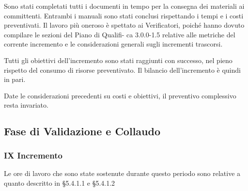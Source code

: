 Sono stati completati tutti i documenti in tempo per la consegna dei materiali ai committenti. Entrambi i manuali sono stati conclusi rispettando i tempi e i costi preventivati. Il lavoro più oneroso è spettato ai Verificatori, poiché hanno dovuto compilare le sezioni del Piano di Qualifi- ca 3.0.0-1.5 relative alle metriche del corrente incremento e le considerazioni generali sugli incrementi trascorsi.

Tutti gli obiettivi dell’incremento sono stati raggiunti con successo, nel pieno rispetto del consumo di risorse preventivato. Il bilancio dell’incremento è quindi in pari.

Date le considerazioni precedenti su costi e obiettivi, il preventivo complessivo resta invariato.


\pagebreak

\subsection{Fase di Validazione e Collaudo}
\subsubsection{IX Incremento}
Le ore di lavoro che sono state sostenute durante questo periodo sono relative a quanto descritto in §5.4.1.1 e §5.4.1.2

